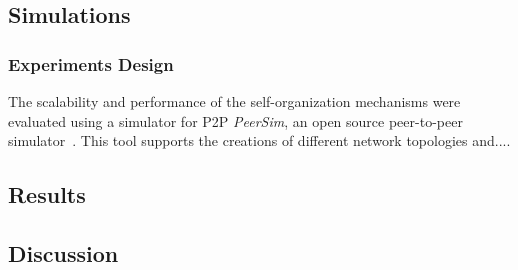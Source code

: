 
\subsection{Simulations}

\subsubsection{Experiments Design}



The scalability and performance of the self-organization mechanisms were evaluated using a simulator for P2P  \textit{PeerSim}, an open source peer-to-peer simulator~\cite{p2p09-peersim}. This tool supports the creations of different network topologies and.... 

%
%

\subsection{Results}

\subsection{Discussion}
